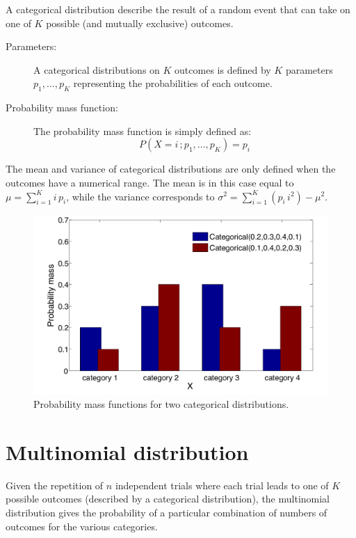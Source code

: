 A categorical distribution describe the result of a random event that can take on one of $K$ possible (and mutually exclusive) outcomes.

\begin{description}
\item [Parameters: ] A categorical distributions on $K$ outcomes is defined by $K$ parameters $p_1, \dots, p_K$ representing the probabilities of each outcome.

\item [Probability mass function: ] The probability mass function is simply defined as:
\begin{equation}
P(X=i\,; p_1, \dots, p_K) = p_i
\end{equation} 
\end{description}

The mean and variance of categorical distributions are only defined when the outcomes have a numerical range.  The mean is in this case equal to $\mu = \sum_{i=1}^{K} i\, p_i$, while the variance corresponds to $\sigma^2 = \sum_{i=1}^K (p_i\, i^2) - \mu^2$.

\begin{figure}[h]
\centering
\includegraphics[scale=0.40]{imgs/categorical_appendix.pdf}
\caption{Probability mass functions for two categorical distributions.} 
\label{fig:categorical-appendix}
\end{figure}

\section*{Multinomial distribution}

Given the repetition of $n$ independent trials where each trial leads to one of $K$ possible outcomes (described by a categorical distribution), the multinomial distribution gives the probability of a particular combination of numbers of outcomes for the various categories. 

